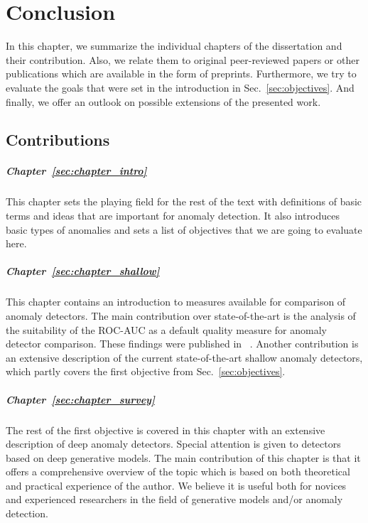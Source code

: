 \chapter{Conclusion} \label{sec:conclusion}
In this chapter, we summarize the individual chapters of the dissertation and their contribution. Also, we relate them to original peer-reviewed papers or other publications which are available in the form of preprints. Furthermore, we try to evaluate the goals that were set in the introduction in Sec.~\ref{sec:objectives}. And finally, we offer an outlook on possible extensions of the presented work.

\section{Contributions}
\paragraph{Chapter~\ref{sec:chapter_intro}} This chapter sets the playing field for the rest of the text with definitions of basic terms and ideas that are important for anomaly detection. It also introduces basic types of anomalies and sets a list of objectives that we are going to evaluate here.

\paragraph{Chapter~\ref{sec:chapter_shallow}} This chapter contains an introduction to measures available for comparison of anomaly detectors. The main contribution over state-of-the-art is the analysis of the suitability of the ROC-AUC as a default quality measure for anomaly detector comparison. These findings were published in ~\cite{vskvara2023auc}. Another contribution is an extensive description of the current state-of-the-art shallow anomaly detectors, which partly covers the first objective from Sec.~\ref{sec:objectives}.

\paragraph{Chapter~\ref{sec:chapter_survey}} The rest of the first objective is covered in this chapter with an extensive description of deep anomaly detectors. Special attention is given to detectors based on deep generative models. The main contribution of this chapter is that it offers a comprehensive overview of the topic which is based on both theoretical and practical experience of the author. We believe it is useful both for novices and experienced researchers in the field of generative models and/or anomaly detection.

